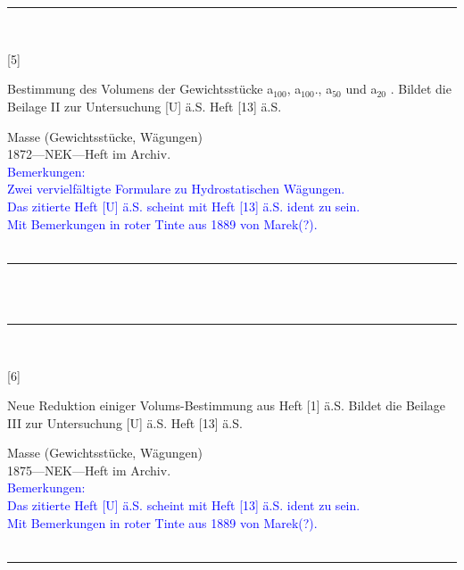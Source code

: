 \\
\vspace*{-2.5pt}\\
\parbox{\textwidth}{%
\rule{\textwidth}{1pt}\vspace*{-3mm}\\
\begin{minipage}[t]{0.1\textwidth}\vspace{0pt}
\Huge\rule[-4mm]{0cm}{1cm}[5]
\end{minipage}
\hfill
\begin{minipage}[t]{0.9\textwidth}\vspace{0pt}
\large Bestimmung des Volumens der Gewichtsstücke a$_\mathrm{100}$, a$_\mathrm{100}$., a$_\mathrm{50}$ und a$_\mathrm{20}$ . Bildet die Beilage II zur Untersuchung [U] ä.S. Heft [13] ä.S.\rule[-2mm]{0mm}{2mm}
\end{minipage}
{\footnotesize\flushright
Masse (Gewichtsstücke, Wägungen)\\
}
1872\quad---\quad NEK\quad---\quad Heft im Archiv.\\
\textcolor{blue}{Bemerkungen:\\{}
Zwei vervielfältigte Formulare zu Hydrostatischen Wägungen.\\{}
Das zitierte Heft [U] ä.S. scheint mit Heft [13] ä.S. ident zu sein.\\{}
Mit Bemerkungen in roter Tinte aus 1889 von Marek(?).\\{}
}
\\[-15pt]
\rule{\textwidth}{1pt}
}
\\
\vspace*{-2.5pt}\\
\parbox{\textwidth}{%
\rule{\textwidth}{1pt}\vspace*{-3mm}\\
\begin{minipage}[t]{0.1\textwidth}\vspace{0pt}
\Huge\rule[-4mm]{0cm}{1cm}[6]
\end{minipage}
\hfill
\begin{minipage}[t]{0.9\textwidth}\vspace{0pt}
\large Neue Reduktion einiger Volums-Bestimmung aus Heft [1] ä.S. Bildet die Beilage III zur Untersuchung [U] ä.S. Heft [13] ä.S.\rule[-2mm]{0mm}{2mm}
\end{minipage}
{\footnotesize\flushright
Masse (Gewichtsstücke, Wägungen)\\
}
1875\quad---\quad NEK\quad---\quad Heft im Archiv.\\
\textcolor{blue}{Bemerkungen:\\{}
Das zitierte Heft [U] ä.S. scheint mit Heft [13] ä.S. ident zu sein.\\{}
Mit Bemerkungen in roter Tinte aus 1889 von Marek(?).\\{}
}
\\[-15pt]
\rule{\textwidth}{1pt}
}
